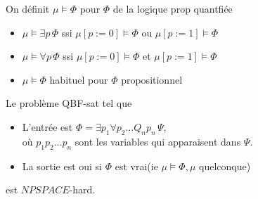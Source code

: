 \documentclass[10pt,a4paper]{article}
\begin{document}
\begin{definition}On définit $\mu \models \Phi$ pour $\Phi$ de la logique prop quantfiée \begin{itemize}
\item $\mu \models \exists p \,\Phi$ ssi $\mu [ p := 0] \models\Phi$ ou $\mu [p := 1] \models \Phi$
\item $\mu \models \forall p \, \Phi$ ssi $\mu [ p := 0] \models\Phi$ et $\mu [p := 1] \models \Phi$
\item $\mu \models  \Phi$ habituel pour $\Phi$ propositionnel
\end{itemize}\end{definition}

\begin{thm}

Le problème QBF-sat tel que
\begin{itemize}
 \item L'entrée est $\Phi = \exists p_1 \forall p_2 \dots Q_n p_n \, \Psi$, \\
où $p_1 p_2 \dots p_n$ sont les variables qui apparaisent dans $\Psi$.
\item La sortie est oui si $\Phi$ est vrai(ie $\mu \models \Phi, \mu$ quelconque)
\end{itemize}
est $NPSPACE$-hard.
\end{thm}
\end{document}
